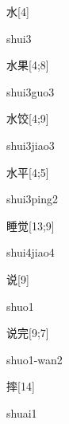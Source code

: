 \begin{verbete}[shui3]{水}[4]
\begin{pronuncia}{shui3}
\end{pronuncia}
\end{verbete}

\begin{verbete}{水果}[4;8]
\begin{pronuncia}{shui3guo3}
\end{pronuncia}
\end{verbete}

\begin{verbete}{水饺}[4;9]
\begin{pronuncia}{shui3jiao3}
\end{pronuncia}
\end{verbete}

\begin{verbete}{水平}[4;5]
\begin{pronuncia}{shui3ping2}
\end{pronuncia}
\end{verbete}

\begin{verbete}{睡觉}[13;9]
\begin{pronuncia}{shui4jiao4}
\end{pronuncia}
\end{verbete}

\begin{verbete}[shuo1]{说}[9]
\begin{pronuncia}{shuo1}
\end{pronuncia}
\end{verbete}

\begin{verbete}{说完}[9;7]
\begin{pronuncia}{shuo1-wan2}
\end{pronuncia}
\end{verbete}

\begin{verbete}[shuai1]{摔}[14]
\begin{pronuncia}{shuai1}
\end{pronuncia}
\end{verbete}

